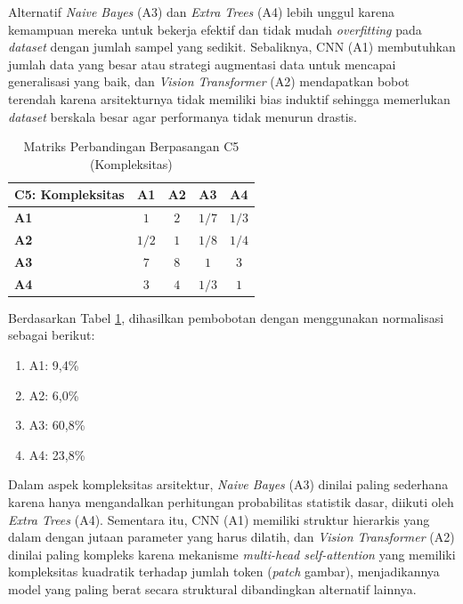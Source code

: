 \begin{enumerate}
	Alternatif \textit{Naive Bayes} (A3) dan \textit{Extra Trees} (A4) lebih unggul karena kemampuan mereka untuk bekerja efektif dan tidak mudah \textit{overfitting} pada \textit{dataset} dengan jumlah sampel yang sedikit. Sebaliknya, CNN (A1) membutuhkan jumlah data yang besar atau strategi augmentasi data untuk mencapai generalisasi yang baik, dan \textit{Vision Transformer} (A2) mendapatkan bobot terendah karena arsitekturnya tidak memiliki bias induktif sehingga memerlukan \textit{dataset} berskala besar agar performanya tidak menurun drastis.
	
	\begin{table}[H]
		\centering
		\caption{Matriks Perbandingan Berpasangan C5 (Kompleksitas)}
		\label{tab:perbandingan_c5}
		\begin{tabular}{|l|c|c|c|c|}
			\hline
			\textbf{C5: Kompleksitas} & \textbf{A1} & \textbf{A2} & \textbf{A3} & \textbf{A4} \\ \hline
			\textbf{A1} & $1$ & $2$ & $1/7$ & $1/3$ \\ \hline
			\textbf{A2} & $1/2$ & $1$ & $1/8$ & $1/4$ \\ \hline
			\textbf{A3} & $7$ & $8$ & $1$ & $3$ \\ \hline
			\textbf{A4} & $3$ & $4$ & $1/3$ & $1$ \\ \hline
		\end{tabular}
	\end{table}
	
	Berdasarkan Tabel \ref{tab:perbandingan_c5}, dihasilkan pembobotan dengan menggunakan normalisasi sebagai berikut:
	\begin{enumerate}
		\item A1: 9,4\%
		\item A2: 6,0\%
		\item A3: 60,8\%
		\item A4: 23,8\%\\	
	\end{enumerate}
	
	Dalam aspek kompleksitas arsitektur, \textit{Naive Bayes} (A3) dinilai paling sederhana karena hanya mengandalkan perhitungan probabilitas statistik dasar, diikuti oleh \textit{Extra Trees} (A4). Sementara itu, CNN (A1) memiliki struktur hierarkis yang dalam dengan jutaan parameter yang harus dilatih, dan \textit{Vision Transformer} (A2) dinilai paling kompleks karena mekanisme \textit{multi-head self-attention} yang memiliki kompleksitas kuadratik terhadap jumlah token (\textit{patch} gambar), menjadikannya model yang paling berat secara struktural dibandingkan alternatif lainnya.
	

\end{enumerate}
